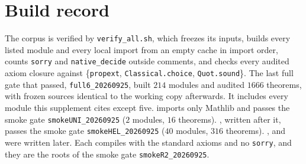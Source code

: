 
\section*{Build record}
The corpus is verified by \texttt{verify\_all.sh}, which freezes its inputs, builds every listed
module and every local import from an empty cache in import order, counts \texttt{sorry} and
\texttt{native\_decide} outside comments, and checks every audited axiom closure against
\{\texttt{propext}, \texttt{Classical.choice}, \texttt{Quot.sound}\}. The last full gate that
passed, \texttt{full6\_20260925}, built $214$ modules and audited $1666$ theorems, with frozen
sources identical to the working copy afterwards. It includes every module this supplement
cites except five.  imports only Mathlib and passes the smoke
gate \texttt{smokeUNI\_20260925} ($2$ modules, $16$ theorems). ,
written after it, passes the smoke gate \texttt{smokeHEL\_20260925} ($40$ modules, $316$ theorems).
,  and
 were written later. Each compiles with the standard axioms and no
\texttt{sorry}, and they are the roots of the smoke gate \texttt{smokeR2\_20260925}.

